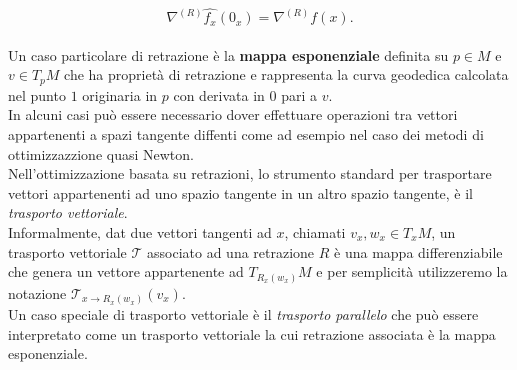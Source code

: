 \documentclass[a4paper, 12pt]{article}
\begin{document}
\[ \nabla^{(R)} \hat{f_x}(0_x) = \nabla^{(R)} f(x).\]\\
Un caso particolare di retrazione è la \textbf{mappa esponenziale} definita su $p \in M$ e $v \in T_pM$ che ha proprietà di retrazione e rappresenta la curva geodedica calcolata nel punto $1$ originaria in $p$ con derivata in $0$ pari a $v$.\\
In alcuni casi può essere necessario dover effettuare operazioni tra vettori appartenenti a spazi tangente diffenti come ad esempio nel caso dei metodi di ottimizzazzione quasi Newton.\\
Nell'ottimizzazione basata su retrazioni, lo strumento standard per trasportare vettori appartenenti ad uno spazio tangente in un altro spazio tangente, è il \textit{trasporto vettoriale}.\\
Informalmente, dat due vettori tangenti ad $x$, chiamati $v_x, w_x \in T_xM$, un trasporto vettoriale $\mathcal{T}$ associato ad una retrazione $R$ è una mappa differenziabile che genera un vettore appartenente ad $T_{R_x(w_x)}M$ e per semplicità utilizzeremo la notazione $\mathcal{T}_{x \to R_x(w_x)}(v_x)$.\\
Un caso speciale di trasporto vettoriale è il \textit{trasporto parallelo} che può essere interpretato come un trasporto vettoriale la cui retrazione associata è la mappa esponenziale.
\end{document}
